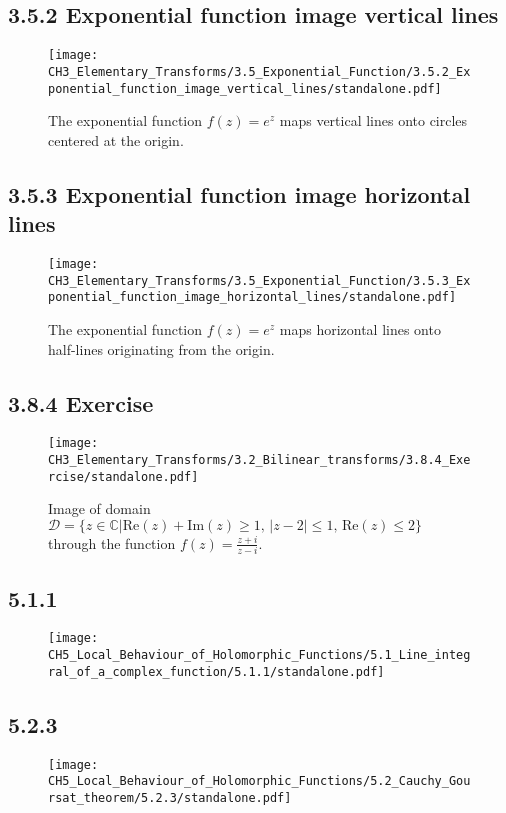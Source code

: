 \documentclass{book}
\begin{document}
\subsection*{3.5.2 Exponential function image vertical lines}
\begin{figure}[H]
\centering
\texttt{[image: CH3\_Elementary\_Transforms/3.5\_Exponential\_Function/3.5.2\_Exponential\_function\_image\_vertical\_lines/standalone.pdf]}
\caption{The exponential function $f(z) = e^z$ maps vertical lines onto circles centered at the origin.}
\end{figure}

\subsection*{3.5.3 Exponential function image horizontal lines}
\begin{figure}[H]
\centering
\texttt{[image: CH3\_Elementary\_Transforms/3.5\_Exponential\_Function/3.5.3\_Exponential\_function\_image\_horizontal\_lines/standalone.pdf]}
\caption{The exponential function $f(z) = e^z$ maps horizontal lines onto half-lines originating from the origin.}
\end{figure}

\subsection*{3.8.4 Exercise}
\begin{figure}[H]
\centering
\texttt{[image: CH3\_Elementary\_Transforms/3.2\_Bilinear\_transforms/3.8.4\_Exercise/standalone.pdf]}
\caption{Image of domain $\mathcal{D} = \{z\in \mathbb{C} | \mathrm{Re}(z) + \mathrm{Im}(z) \ge 1, \, |z-2| \le 1, \, \mathrm{Re}(z) \le 2 \}$ through the function $f(z) = \frac{z+i}{z-i}$.}
\end{figure}

\subsection*{5.1.1}
\begin{figure}[H]
\centering
\texttt{[image: CH5\_Local\_Behaviour\_of\_Holomorphic\_Functions/5.1\_Line\_integral\_of\_a\_complex\_function/5.1.1/standalone.pdf]}
\caption{}
\end{figure}

\subsection*{5.2.3}
\begin{figure}[H]
\centering
\texttt{[image: CH5\_Local\_Behaviour\_of\_Holomorphic\_Functions/5.2\_Cauchy\_Goursat\_theorem/5.2.3/standalone.pdf]}
\caption{}
\end{figure}
\end{document}
